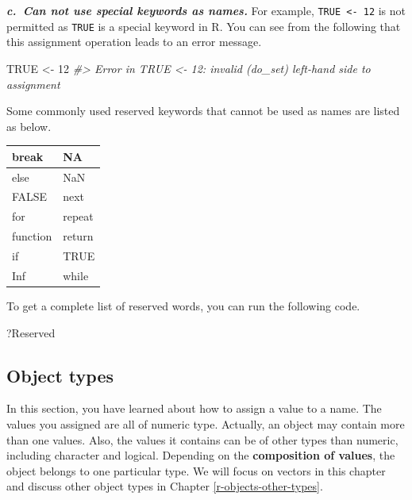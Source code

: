 \documentclass[
]{book}
\newenvironment{Shaded}{\begin{snugshade}}{\end{snugshade}}
\newcommand{\CommentTok}[1]{\textcolor[rgb]{0.56,0.35,0.01}{\textit{#1}}}
\newcommand{\ConstantTok}[1]{\textcolor[rgb]{0.00,0.00,0.00}{#1}}
\newcommand{\DecValTok}[1]{\textcolor[rgb]{0.00,0.00,0.81}{#1}}
\newcommand{\NormalTok}[1]{#1}
\newcommand{\OtherTok}[1]{\textcolor[rgb]{0.56,0.35,0.01}{#1}}
\begin{document}
\textbf{\emph{c.~Can not use special keywords as names.}}
For example, \texttt{TRUE\ \textless{}-\ 12} is not permitted as \texttt{TRUE} is a special keyword in R. You can see from the following that this assignment operation leads to an error message.

\begin{Shaded}
\begin{Highlighting}[]
\ConstantTok{TRUE} \OtherTok{\textless{}{-}} \DecValTok{12}
\CommentTok{\#\textgreater{} Error in TRUE \textless{}{-} 12: invalid (do\_set) left{-}hand side to assignment}
\end{Highlighting}
\end{Shaded}

Some commonly used reserved keywords that cannot be used as names are listed as below.

\begin{tabular}{l|l}
\hline
break & NA\\
\hline
else & NaN\\
\hline
FALSE & next\\
\hline
for & repeat\\
\hline
function & return\\
\hline
if & TRUE\\
\hline
Inf & while\\
\hline
\end{tabular}

To get a complete list of reserved words, you can run the following code.

\begin{Shaded}
\begin{Highlighting}[]
\NormalTok{?Reserved}
\end{Highlighting}
\end{Shaded}

\hypertarget{object-types}{%
\subsection{Object types}\label{object-types}}

In this section, you have learned about how to assign a value to a name. The values you assigned are all of numeric type. Actually, an object may contain more than one values. Also, the values it contains can be of other types than numeric, including character and logical. Depending on the \textbf{composition of values}, the object belongs to one particular type. We will focus on vectors in this chapter and discuss other object types in Chapter \ref{r-objects-other-types}.
\end{document}

